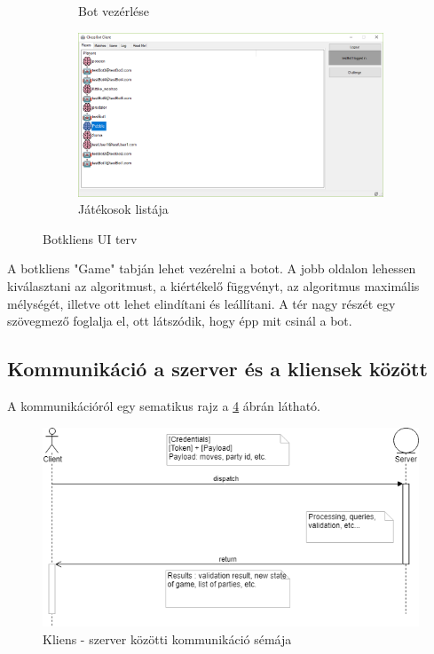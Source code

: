 \documentclass[twoside, a4paper, 12pt]{article}
\begin{document}
\begin{figure}
\begin{subfigure}[b]{0.475\textwidth}
		\caption{Bot vezérlése}
		\label{fig:botClientGame}
	\end{subfigure}
	\quad
	\begin{subfigure}[b]{0.475\textwidth}   
		\centering 
		\includegraphics[width=\textwidth]{img/botClientPlayers.png}
		\caption{Játékosok listája}
		\label{fig:botClientPlayers}
	\end{subfigure}
	\caption[ Botkliens UI terv ]
	{\small Botkliens UI terv}
	\label{fig:botClient}
\end{figure}

A botkliens "Game" tabján lehet vezérelni a botot. A jobb oldalon lehessen kiválasztani az algoritmust, a kiértékelő függvényt, az algoritmus maximális mélységét, illetve ott lehet elindítani és leállítani. A tér nagy részét egy szövegmező foglalja el, ott látszódik, hogy épp mit csinál a bot.

\subsection{Kommunikáció a szerver és a kliensek között}
A kommunikációról egy sematikus rajz a \ref{fig:clientServerCommunication} ábrán látható.

\begin{figure}[htbp]
	\centering
	\includegraphics[width=1.0\textwidth]{img/clientServerCommunication.png}
	\caption{Kliens - szerver közötti kommunikáció sémája}
	\label{fig:clientServerCommunication}
\end{figure}
\end{document}
